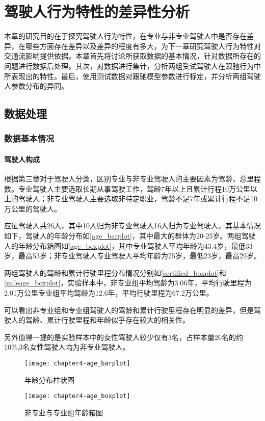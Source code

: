 \chapter{驾驶人行为特性的差异性分析}
本章的研究目的在于探究驾驶人行为特性，在专业与非专业驾驶人中是否存在差异，在哪些方面存在差异以及差异的程度有多大，为下一章研究驾驶人行为特性对交通流影响提供依据。本章首先将讨论所获取数据的基本情况，针对数据所存在的问题进行数据后处理。其次，对数据进行集计，分析两组受试驾驶人在跟驰行为中所表现出的特性。最后，使用测试数据对跟驰模型参数进行标定，并分析两组驾驶人参数分布的异同。
\section{数据处理}
\subsection{数据基本情况}
\subsubsection{驾驶人构成}

根据第三章对于驾驶人分类，区别专业与非专业驾驶人的主要因素为驾龄，总里程数。专业驾驶人主要选取长期从事驾驶工作，驾龄7年以上且累计行程10万公里以上的驾驶人；非专业驾驶人主要选取非特定职业，驾龄不足7年或累计行程不足10万公里的驾驶人。

应征驾驶人共26人，其中10人归为非专业驾驶人16人归为专业驾驶人，其基本情况如下，驾驶人的年龄分布如\autoref{age_barplot}，其中最大的群体为20-25岁。两组驾驶人的年龄分布箱图如\autoref{age_boxplot}，其中专业驾驶人平均年龄为43.4岁，最低33岁，最高53岁；非专业驾驶人专业驾驶人平均年龄为25岁，最低23岁，最高29岁。

两组驾驶人的驾龄和累计行驶里程分布情况分别如\autoref{certified_boxplot}和\autoref{mileage_boxplot}，实验样本中，非专业组平均驾龄为3.06年，平均行驶里程为2.01万公里专业组平均驾龄为12.6年，平均行驶里程为67.2万公里。

可以看出非专业组和专业组驾驶人的驾龄和累计行驶里程存在明显的差异，但是驾驶人的驾龄、累计行驶里程和年龄似乎存在较大的相关性。

另外值得一提的是实验样本中的女性驾驶人较少仅有3名，占样本量26名的约10\%,3名女性驾驶人均为非专业驾驶人。



\begin{figure}
\begin{minipage}[t]{0.48\linewidth}
\centering
\texttt{[image: chapter4-age\_barplot]}
\caption{年龄分布柱状图}
\label{age_barplot}
\end{minipage}%
\hspace*{0.04\linewidth}
\begin{minipage}[t]{0.48\linewidth}
\centering
\texttt{[image: chapter4-age\_boxplot]}
\caption{非专业与专业组年龄箱图}
\label{age_boxplot}
\end{minipage}
\end{figure}


